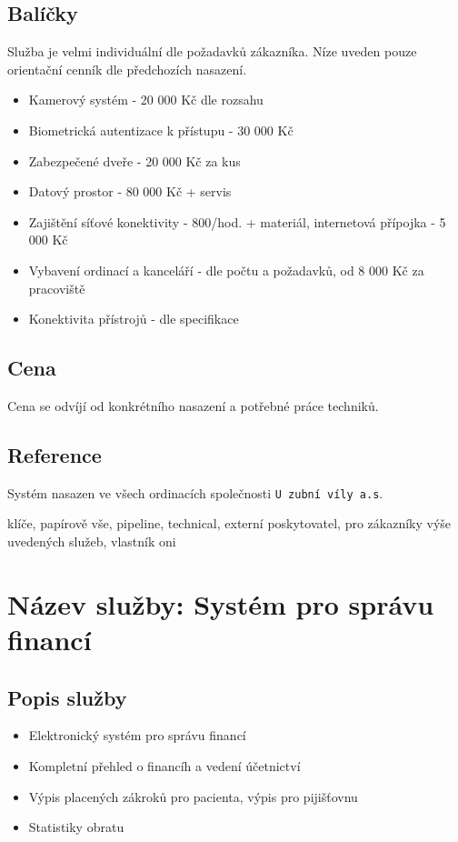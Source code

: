 \documentclass[12pt, a4paper, titlepage]{article}
\begin{document}
	\subsection*{Balíčky}
	Služba je velmi individuální dle požadavků zákazníka. Níze uveden pouze orientační cenník dle předchozích nasazení. 

	\begin{itemize}
		\item Kamerový systém - 20 000 Kč dle rozsahu
		\item Biometrická autentizace k přístupu - 30 000 Kč
		\item Zabezpečené dveře - 20 000 Kč za kus
		\item Datový prostor - 80 000 Kč + servis
		\item Zajištění síťové konektivity - 800/hod. + materiál, internetová přípojka - 5 000 Kč
		\item Vybavení ordinací a kanceláří - dle počtu a požadavků, od 8 000 Kč za pracoviště
		\item Konektivita přístrojů - dle specifikace
	\end{itemize}

	\subsection*{Cena}
	Cena se odvíjí od konkrétního nasazení a potřebné práce techniků.


	\newpage

	\noindent\makebox[\linewidth]{\rule{16cm}{0.4pt}}

	\subsection*{Reference}
	Systém nasazen ve všech ordinacích společnosti \texttt{U zubní víly a.s}.


	klíče, papírově vše, pipeline, technical, externí poskytovatel, pro zákazníky výše uvedených služeb,
	vlastník oni

	\section*{Název služby: Systém pro správu financí}

	\subsection*{Popis služby}
	\begin{itemize}
		\item Elektronický systém pro správu financí
		\item Kompletní přehled o financíh a vedení účetnictví
		\item Výpis placených zákroků pro pacienta, výpis pro pijišťovnu
		\item Statistiky obratu
	\end{itemize}
\end{document}

